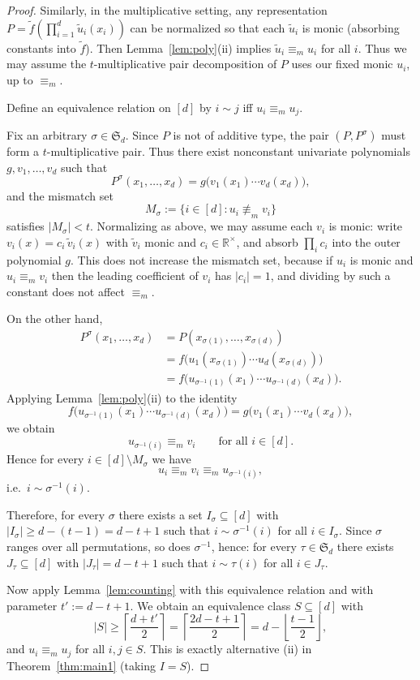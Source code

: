 \documentclass[10pt,a4paper]{amsart}
\begin{document}
\begin{proof}
Similarly, in the multiplicative setting, any representation $P=\widetilde f(\prod_{i=1}^d \widetilde u_i(x_i))$
can be normalized so that each $\widetilde u_i$ is monic (absorbing constants into $\widetilde f$).
Then Lemma~\ref{lem:poly}(ii) implies $\widetilde u_i\equiv_m u_i$ for all $i$.
Thus we may assume the $t$-multiplicative pair decomposition of $P$ uses our fixed monic $u_i$, up to $\equiv_m$.



Define an equivalence relation on $[d]$ by $i\sim j$ iff $u_i\equiv_m u_j$.

Fix an arbitrary $\sigma\in\mathfrak S_d$.
Since $P$ is not of additive type, the pair $(P,P^\sigma)$ must form a $t$-multiplicative pair.
Thus there exist nonconstant univariate polynomials $g,v_1,\ldots,v_d$ such that
\[
P^{\sigma}(x_1,\ldots,x_d)=g\big(v_1(x_1)\cdots v_d(x_d)\big),
\]
and the mismatch set
\[
M_{\sigma}:=\{i\in[d]: u_i\not\equiv_m v_i\}
\]
satisfies $|M_\sigma|<t$.
Normalizing as above, we may assume each $v_i$ is monic: write $v_i(x)=c_i\,\widetilde v_i(x)$ with $\widetilde v_i$ monic and $c_i\in\mathbb R^\times$, and absorb $\prod_i c_i$ into the outer polynomial $g$.
This does not increase the mismatch set, because if $u_i$ is monic and $u_i\equiv_m v_i$ then the leading coefficient of $v_i$ has $|c_i|=1$, and dividing by such a constant does not affect $\equiv_m$.


On the other hand,
\begin{align*}
P^{\sigma}(x_1,\ldots,x_d)
&=P(x_{\sigma(1)},\ldots,x_{\sigma(d)})\\
&=f\big(u_1(x_{\sigma(1)})\cdots u_d(x_{\sigma(d)})\big)\\
&=f\big(u_{\sigma^{-1}(1)}(x_1)\cdots u_{\sigma^{-1}(d)}(x_d)\big).
\end{align*}
Applying Lemma~\ref{lem:poly}(ii) to the identity
\[
f\big(u_{\sigma^{-1}(1)}(x_1)\cdots u_{\sigma^{-1}(d)}(x_d)\big)
=
g\big(v_1(x_1)\cdots v_d(x_d)\big),
\]
we obtain
\[
u_{\sigma^{-1}(i)}\equiv_m v_i \qquad \text{for all } i\in[d].
\]
Hence for every $i\in[d]\setminus M_\sigma$ we have
\[
u_i\equiv_m v_i\equiv_m u_{\sigma^{-1}(i)},
\]
i.e.\ $i\sim \sigma^{-1}(i)$.

Therefore, for every $\sigma$ there exists a set $I_\sigma\subseteq[d]$ with
$|I_\sigma|\ge d-(t-1)=d-t+1$ such that $i\sim \sigma^{-1}(i)$ for all $i\in I_\sigma$.
Since $\sigma$ ranges over all permutations, so does $\sigma^{-1}$, hence:
for every $\tau\in\mathfrak S_d$ there exists $J_\tau\subseteq[d]$ with $|J_\tau|=d-t+1$ such that
$i\sim \tau(i)$ for all $i\in J_\tau$.

Now apply Lemma~\ref{lem:counting} with this equivalence relation and with parameter $t':=d-t+1$.
We obtain an equivalence class $S\subseteq[d]$ with
\[
|S|\ge \left\lceil \frac{d+t'}2\right\rceil
=\left\lceil \frac{2d-t+1}{2}\right\rceil
=d-\left\lfloor \frac{t-1}{2}\right\rfloor,
\]
and $u_i\equiv_m u_j$ for all $i,j\in S$.
This is exactly alternative (ii) in Theorem~\ref{thm:main1} (taking $I=S$).

\end{proof}
\end{document}
